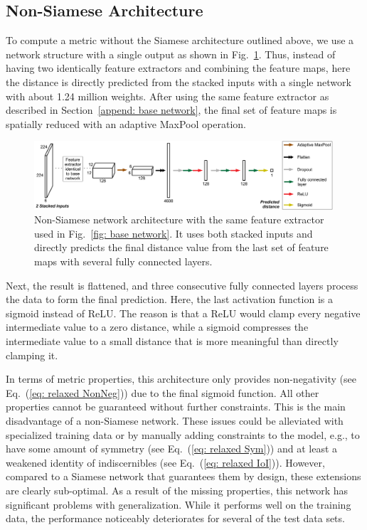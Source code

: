 \subsection{Non-Siamese Architecture}
To compute a metric without the Siamese architecture outlined above, we use a network structure with a single output as shown in 
Fig.~\ref{fig: non-siamese network}. Thus, instead of having two identically feature extractors and combining the feature maps, here the distance is directly predicted from the stacked inputs with a single network with about 1.24 million weights. After using the same feature extractor as described in Section~\ref{append: base network}, the final set of feature maps is spatially reduced with an adaptive MaxPool operation.
\begin{figure}[ht]
    \centering
    \includegraphics[width=0.99\textwidth]{Images/NetworkNonSiamese}
    \caption{Non-Siamese network architecture with the same feature extractor used in Fig.~\ref{fig: base network}. It uses both stacked inputs and directly predicts the final distance value from the last set of feature maps with several fully connected layers.}
    \label{fig: non-siamese network}
\end{figure}
Next, the result is flattened, and three consecutive fully connected layers process the data to form the final prediction. Here, the last activation function is a sigmoid instead of ReLU. The reason is that a ReLU would clamp every negative intermediate value to a zero distance, while a sigmoid compresses the intermediate value to a small distance that is more meaningful than directly clamping it.
 
In terms of metric properties, this architecture only provides non-negativity (see Eq.~(\ref{eq: relaxed NonNeg})) due to the final sigmoid function. All other properties cannot be guaranteed without further constraints. This is the main disadvantage of a non-Siamese network. These issues could be alleviated with specialized training data or by manually adding constraints to the model, e.g., to have some amount of symmetry (see Eq.~(\ref{eq: relaxed Sym})) and at least a weakened identity of indiscernibles (see Eq.~(\ref{eq: relaxed IoI})). However, compared to a Siamese network that guarantees them by design, these extensions are clearly sub-optimal. As a result of the missing properties, this network has significant problems with generalization. While it performs well on the training data, the performance noticeably deteriorates for several of the test data sets.


